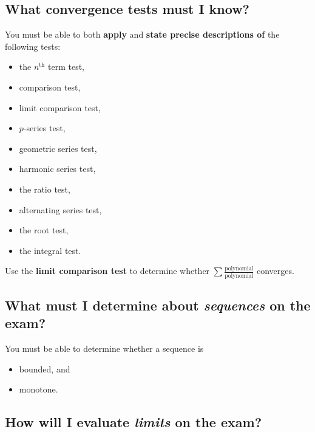 \documentclass[12pt]{article}
\theoremstyle{definition}
\begin{document}
\pagebreak

\subsection*{What convergence tests must I know?}

You must be able to both \textbf{apply} and \textbf{state precise descriptions of} the following tests:
\begin{multicols}{2}
\begin{itemize}
\item the $n^{\mbox{th}}$ term test,
\item comparison test,
\item limit comparison test,
\item $p$-series test,
\item geometric series test,
\item harmonic series test,
\item the ratio test,
\item alternating series test,
\item the root test,
\item the integral test.
\end{itemize}
\end{multicols}
\noindent Use the \textbf{limit comparison test} to determine whether
$
\displaystyle\sum \displaystyle\frac{\mbox{polynomial}}{\mbox{polynomial}}
$
converges.

\subsection*{What must I determine about \textit{sequences} on the exam?}

You must be able to determine whether a sequence is
\begin{multicols}{2}
\begin{itemize}
\item bounded, and
\item monotone.
\end{itemize}
\end{multicols}


\subsection*{How will I evaluate \textit{limits} on the exam?}
\end{document}
